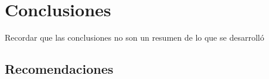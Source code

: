\chapter{Conclusiones}

Recordar que las conclusiones no son un resumen de lo que se desarrolló

\section{Recomendaciones}



